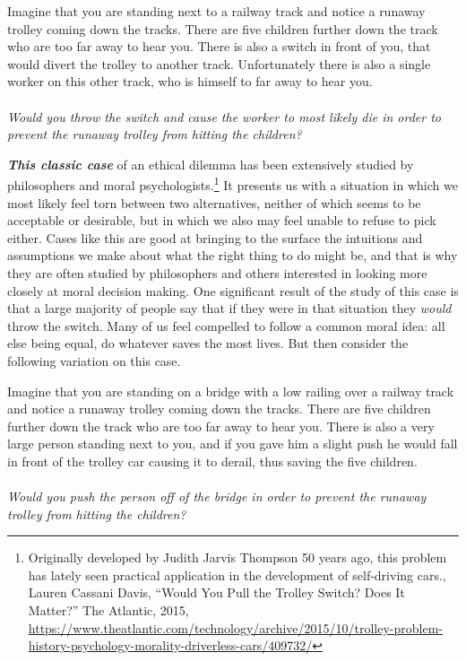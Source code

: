 \documentclass[
  12pt, openany]{book}
\makeatletter
\newenvironment{kframe}{%
\medskip{}
\setlength{\fboxsep}{.8em}
 \def\at@end@of@kframe{}%
 \ifinner\ifhmode%
  \def\at@end@of@kframe{\end{minipage}}%
  \begin{minipage}{\columnwidth}%
 \fi\fi%
 \def\FrameCommand##1{\hskip\@totalleftmargin \hskip-\fboxsep
 \colorbox{shadecolor}{##1}\hskip-\fboxsep
     \hskip-\linewidth \hskip-\@totalleftmargin \hskip\columnwidth}%
 \MakeFramed {\advance\hsize-\width
   \@totalleftmargin\z@ \linewidth\hsize
   \@setminipage}}%
 {\par\unskip\endMakeFramed%
 \at@end@of@kframe}
\newenvironment{rmdblock}[1]
  {
  \begin{itemize}
  \renewcommand{\labelitemi}{
    \raisebox{-.7\height}[0pt][0pt]{
      {\setkeys{Gin}{width=3em,keepaspectratio}\texttt{[image: img/\#1]}}
    }
  }
  \setlength{\fboxsep}{1em}
  \begin{kframe}
  \item
  }
  {
  \end{kframe}
  \end{itemize}
  }
\newenvironment{question}
  {\begin{rmdblock}{question}}
  {\end{rmdblock}}
\theoremstyle{definition}
\theoremstyle{definition}
\theoremstyle{definition}
\theoremstyle{remark}
\makeatother
\begin{document}
\begin{question}

Imagine that you are standing next to a railway track and notice a runaway trolley coming down the tracks. There are five children further down the track who are too far away to hear you. There is also a switch in front of you, that would divert the trolley to another track. Unfortunately there is also a single worker on this other track, who is himself to far away to hear you.\\
~\\
\emph{Would you throw the switch and cause the worker to most likely die in order to prevent the runaway trolley from hitting the children?}

\end{question}

\textbf{\emph{This classic case}} of an ethical dilemma has been extensively studied by philosophers and moral psychologists.\footnote{Originally developed by Judith Jarvis Thompson 50 years ago, this problem has lately seen practical application in the development of self-driving cars., Lauren Cassani Davis, ``Would You Pull the Trolley Switch? Does It Matter?'' The Atlantic, 2015, \url{https://www.theatlantic.com/technology/archive/2015/10/trolley-problem-history-psychology-morality-driverless-cars/409732/}} It presents us with a situation in which we most likely feel torn between two alternatives, neither of which seems to be acceptable or desirable, but in which we also may feel unable to refuse to pick either. Cases like this are good at bringing to the surface the intuitions and assumptions we make about what the right thing to do might be, and that is why they are often studied by philosophers and others interested in looking more closely at moral decision making. One significant result of the study of this case is that a large majority of people say that if they were in that situation they \emph{would} throw the switch. Many of us feel compelled to follow a common moral idea: all else being equal, do whatever saves the most lives. But then consider the following variation on this case.

\begin{question}

Imagine that you are standing on a bridge with a low railing over a railway track and notice a runaway trolley coming down the tracks. There are five children further down the track who are too far away to hear you. There is also a very large person standing next to you, and if you gave him a slight push he would fall in front of the trolley car causing it to derail, thus saving the five children.\\
~\\
\emph{Would you push the person off of the bridge in order to prevent the runaway trolley from hitting the children?}

\end{question}
\end{document}
